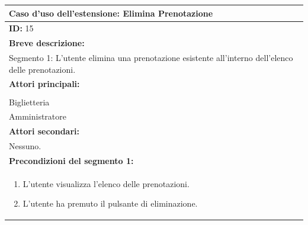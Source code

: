 \documentclass{article}
\begin{document}
                \begin{table}[H]
                    \begin{tabular}{|p{\linewidth}|}
                        \hline
                        \cellcolor{gray!100}
                        \color{white}
                        \centerline{\textbf{Caso d'uso dell'estensione:} Elimina Prenotazione} \\
                        \hline
                        \textbf{ID:} 15 \\
                        \hline
                        \cellcolor{gray!20}
                        \textbf{Breve descrizione:} \\
                        \cellcolor{gray!20}
                        Segmento 1: L'utente elimina una prenotazione esistente all'interno dell'elenco delle prenotazioni. \\
                        \hline
                        \textbf{Attori principali:} \\
                        \begin{minipage}{\linewidth}
                            Cliente \\
                            Biglietteria \\
                            Amministratore
                        \end{minipage}
                        \vspace{0pt} \\
                        \hline
                        \textbf{Attori secondari:} \\                        
                        Nessuno. \\
                        \hline
                        \cellcolor{gray!20}
                        \textbf{Precondizioni del segmento 1:} \\
                        \cellcolor{gray!20}
                        \begin{minipage}{\linewidth}
                            \begin{enumerate}
                                \item L'utente visualizza l'elenco delle prenotazioni.
                                \item L'utente ha premuto il pulsante di eliminazione.
                            \end{enumerate}
                        \end{minipage}

\end{tabular}
\end{table}
\end{document}

